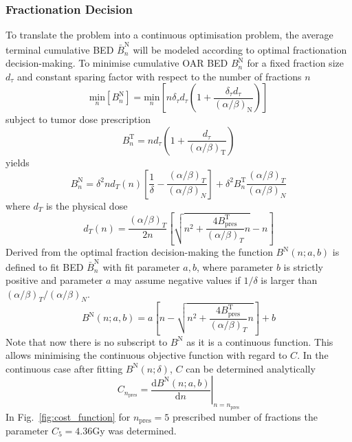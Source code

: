 \documentclass[\relativeRoot/ada.tex]{subfiles}
\begin{document}
\subsubsection{Fractionation Decision}
To translate the problem into a continuous optimisation problem, the average terminal cumulative BED $\bar{B}^{\text{N}}_n$ will be modeled according to optimal fractionation decision-making. To minimise cumulative OAR BED $B^{\text{N}}_n$ for a fixed fraction size $d_{\tau}$ and constant sparing factor with respect to the number of fractions $n$
\begin{equation*}
    \underset{n}{\text{min}} \left[ B^{\text{N}}_n \right] = \underset{n}{\text{min}} \left[ n \delta_\tau d_\tau( 1 +\frac{\delta_\tau d_\tau}{({\alpha}/{\beta})_\text{N}}) \right]
\end{equation*}
subject to tumor dose prescription
\begin{equation*}
    B^{\text{T}}_n = n d_\tau( 1 +\frac{d_\tau}{({\alpha}/{\beta})_\text{T}})
\end{equation*}
yields
\begin{equation*}
    B^{\text{N}}_n = \delta^2 n d_T(n) \left[ \frac{1}{\delta} - \frac{(\alpha / \beta) _T}{(\alpha / \beta)_N}\right] + \delta^2 B^{\text{T}}_n \frac{(\alpha / \beta) _T}{(\alpha / \beta)_N}
\end{equation*}
where $d_T$ is the physical dose
\begin{equation*}
    d_T(n) = \frac{(\alpha / \beta)_T}{2n} \left[ \sqrt{n^2 + \frac{4 B_{\text{pres}}^{\text{T}}}{(\alpha / \beta)_T} n } - n \right]
\end{equation*}
Derived from the optimal fraction decision-making the function $B^{\text{N}}(n; a, b)$ is defined to fit BED $\bar{B}^{\text{N}}_n$ with fit parameter $a,b$, where parameter $b$ is strictly positive and parameter $a$ may assume negative values if ${1}/{\delta}$ is larger than ${(\alpha / \beta) _T}/{(\alpha / \beta)_N}$.
\begin{equation}
    B^{\text{N}}(n; a, b) = a \left[ n - \sqrt{n^2 +  \frac{4 B_{\text{pres}}^{\text{T}}}{(\alpha / \beta)_T} n} \right] + b
\end{equation}
Note that now there is no subscript to $B^{\text{N}}$ as it is a continuous function. This allows minimising the continuous objective function with regard to $C$. In the continuous case after fitting $B^{\text{N}}(n; \delta)$, $C$ can be determined analytically
\begin{equation*}
    C_{n_{\text{pres}}} = \left.\frac{\text{d} B^{\text{N}}(n; a, b)}{\text{d} n}\right|_{n=n_{\text{pres}}}
\end{equation*}
In Fig.~\ref{fig:cost_function} for $n_{\text{pres}}=5$ prescribed number of fractions the parameter $C_5=4.36$Gy was determined.
\end{document}
